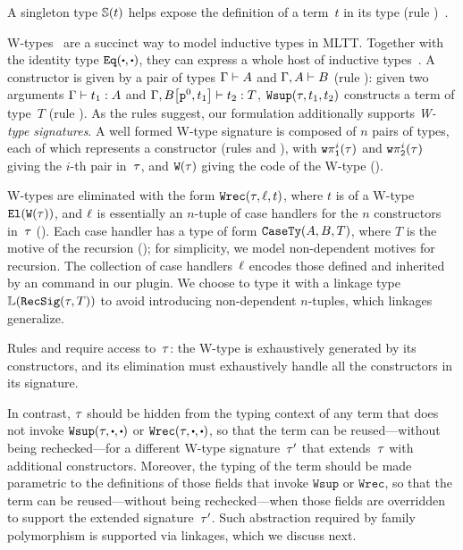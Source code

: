 A singleton type $\mathbb{S}({t})$ helps expose the definition of a term~$t$
in its type (rule )~\cite{aspinall1995singleton,stone2000}.


W-types~\cite{martin1984intuitionistic} are a succinct way to model
inductive types in MLTT.
Together with the identity type $\TyId{\cDot}{\cDot}$, they can express a
whole host of inductive types~\cite{hugunin2021not}.
%
A constructor is given by a pair of types
$ {\Gamma} \vdash {A} $ and $ {\Gamma,A} \vdash {B} $ (rule ):
given two arguments $ {\Gamma} \vdash {t_1} : {A} $ and
$ {\Gamma,{B}\!\left[{{\texttt{p}^{0}},{t_1}}\right]} \vdash {t_2} : {T} $,
$\texttt{Wsup}({\tau},{t_1},{t_2})$ constructs a term of type~$T$ (rule ).
As the rules suggest, our formulation additionally supports
\emph{W-type signatures}.
A well formed W-type signature  is
composed of $n$ pairs of types, each of which represents a constructor
(rules  and ),
with $\texttt{w}\pi^{i}_{\texttt{1}}({\tau})$ and $\texttt{w}\pi^{i}_{\texttt{2}}({\tau})$ giving the
$i$-th pair in~$\tau$, and $\texttt{W}({\tau})$ giving the code of the W-type ().

W-types are eliminated with the form $\texttt{Wrec}({\tau},{\ell},{t})$, where $t$ is of a
W-type $\texttt{El}({\texttt{W}({\tau})})$, and $\ell$ is essentially an $n$-tuple of
case handlers for the $n$ constructors in~$\tau$ ().
Each case handler has a type of form $\texttt{CaseTy}({A},{B},{T})$, where
$T$ is the motive of the recursion ();
for simplicity, we model non-dependent motives for recursion.
The collection of case handlers~$\ell$ encodes those defined and inherited
by an  command in our plugin.
We choose to type it with a linkage type $\mathbb{L}({\texttt{RecSig}({\tau},{T})})$
to avoid introducing non-dependent $n$-tuples, which linkages generalize.

Rules  and  require access to~$\tau$:
the W-type is exhaustively generated by its constructors, and
its elimination must exhaustively handle all the constructors in
its signature.

In contrast, $\tau$ should be hidden from the typing context of any
term that does not invoke $\Wsup{\wsig}{\cDot}{\cDot}$ or $\Wrec{\wsig}{\cDot}{\cDot}$, so that
the term can be reused---without being rechecked---for a different
W-type signature~$\tau'$ that extends~$\tau$ with additional
constructors.
Moreover, the typing of the term should be made parametric to
the definitions of those fields that invoke $\texttt{Wsup}$ or $\texttt{Wrec}$,
so that the term can be reused---without being rechecked---when those fields
are overridden to support the extended signature~$\tau'$.
%
Such abstraction required by family polymorphism is supported via linkages,
which we discuss next.


